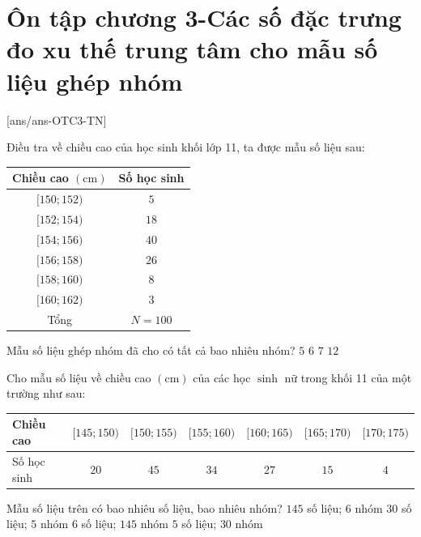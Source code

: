 \section{Ôn tập chương 3-Các số đặc trưng đo xu thế trung tâm cho mẫu số liệu ghép nhóm}
[ans/ans-OTC3-TN]
\caulc
\begin{ex}%
Điều tra về chiều cao của học sinh khối lớp 11, ta được mẫu số liệu sau:
\begin{center}
\begin{tabular}{|c|c|}
\hline Chiều cao $(\mathrm{cm})$ & Số học sinh \\
\hline$[150; 152)$ & $5$ \\
\hline$[152; 154)$ & $18$ \\
\hline$[154; 156)$ & $40$ \\
\hline$[156; 158)$ & $26$ \\
\hline$[158; 160)$ & $8$ \\
\hline$[160; 162)$ & $3$ \\
\hline Tổng & $N=100$ \\
\hline
\end{tabular}
\end{center}
Mẫu số liệu ghép nhóm đã cho có tất cả bao nhiêu nhóm?
	\choice
	{$5$}
	{\True $6$}
	{$7$}
	{$12$}
\end{ex}

\begin{ex}%
Cho mẫu số liệu về chiều cao $(\mathrm{cm})$ của các học $\sinh$ nữ trong khối 11 của một trường như sau:
\begin{center}
\begin{tabular}{|l|c|c|c|c|c|c|}
\hline Chiều cao & {$[145; 150)$} & {$[150; 155)$} & {$[155; 160)$} & {$[160; 165)$} & {$[165; 170)$} & {$[170; 175)$} \\
\hline Số học sinh & $20$ & $45$ & $34$ & $27$ & $15$ & $4$ \\
\hline
\end{tabular}
\end{center}
Mẫu số liệu trên có bao nhiêu số liệu, bao nhiêu nhóm?
	\choice
	{$145$ số liệu; $6$ nhóm}
	{$30$ số liệu; $5$ nhóm}
	{\True $6$ số liệu; $145$ nhóm}
	{$5$ số liệu; $30$ nhóm}
	\loigiai{
Mẫu số liệu $(T)$ có
$$20+45+34+27+15+4=145\text{ (số liệu).}$$
$6$ nhóm là $[145; 150)$; $[150; 155)$; $[155; 160)$; $[160; 165)$; $[165; 170)$; $[170; 175)$.
}
\end{ex}

